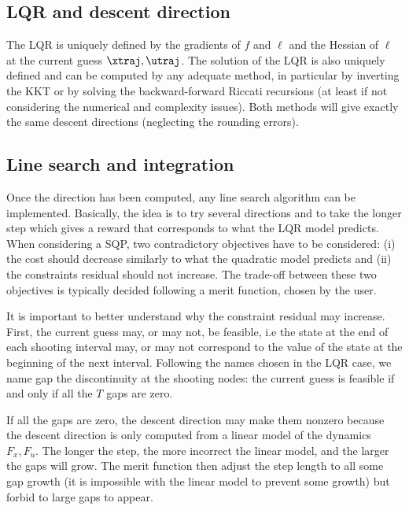 \documentclass[10pt,a4paper]{article}
\begin{document}
\subsection{LQR and descent direction}
The LQR is uniquely defined by the gradients of $f$ and $\ell$ and the Hessian of $\ell$ at the current guess $\xtraj,\utraj$.
The solution of the LQR is also uniquely defined and can be computed by any adequate method, in particular by inverting the KKT or by solving the backward-forward Riccati recursions (at least if not considering the numerical and complexity issues).
Both methods will give exactly the same descent directions (neglecting the rounding errors).

\subsection{Line search and integration}
Once the direction has been computed, any line search algorithm can be implemented.
Basically, the idea is to try several directions and to take the longer step which gives a reward that corresponds to what the LQR model predicts.
When considering a SQP, two contradictory objectives have to be considered: (i) the cost should decrease similarly to what the quadratic model predicts and (ii) the constraints residual should not increase.
The trade-off between these two objectives is typically decided following a merit function, chosen by the user.

It is important to better understand why the constraint residual may increase.
First, the current guess may, or may not, be feasible, i.e the state at the end of each shooting interval may, or may not correspond to the value of the state at the beginning of the next interval.
Following the names chosen in the LQR case, we name gap the discontinuity at the shooting nodes: the current guess is feasible if and only if all the $T$ gaps are zero.

If all the gaps are zero, the descent direction may make them nonzero because the descent direction is only computed from a linear model of the dynamics $F_x,F_u$.
The longer the step, the more incorrect the linear model, and the larger the gaps will grow.
The merit function then adjust the step length to all some gap growth (it is impossible with the linear model to prevent some growth) but forbid to large gaps to appear.
\end{document}
